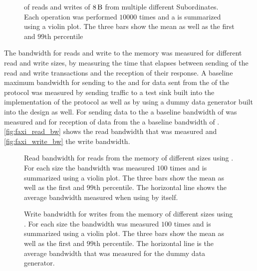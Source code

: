 \begin{figure}[H]
\caption{\rtt{} of reads and writes of $\SI{8}{\byte}$ from multiple different \AXI{} Subordinates. Each operation was performed $\num{10000}$ times and a is summarized using a violin plot. The three bars show the mean as well as the first and $99$th percentile}\label{fig:faxi_rtt}
\end{figure}

The bandwidth for reads and write to the \DDR{} memory was measured for different read and write sizes, by measuring the time that elapses between sending of the read and write transactions and the reception of their response. A baseline maximum bandwidth for sending to the \FPGA{} and for data sent from the \FPGA{} of the \HostARQ{} protocol was measured by sending \HostARQ{} traffic to a test sink built into the \FPGA{} implementation of the \HostARQ{} protocol as well as by using a dummy data generator built into the design as well. For sending data to the \FPGA{} a baseline bandwidth of  was measured and for reception of data from the \FPGA{} a baseline bandwidth of . \autoref{fig:faxi_read_bw} shows the read bandwidth that was measured and \autoref{fig:faxi_write_bw} the write bandwidth.

\begin{figure}[H]
\caption{Read bandwidth for reads from the \DDR{} memory of different sizes using \FAXI{}. For each size the bandwidth was measured $\num{100}$ times and is summarized using a violin plot. The three bars show the mean as well as the first and $99$th percentile. The horizontal line shows the average bandwidth measured when using \HostARQ{} by itself.}\label{fig:faxi_read_bw}
\end{figure}

\begin{figure}[H]
\caption{Write bandwidth for writes from the \DDR{} memory of different sizes using \FAXI{}. For each size the bandwidth was measured $\num{100}$ times and is summarized using a violin plot. The three bars show the mean as well as the first and $99$th percentile. The horizontal line is the average bandwidth that was measured for the \HostARQ{} dummy data generator.}\label{fig:faxi_write_bw}
\end{figure}

